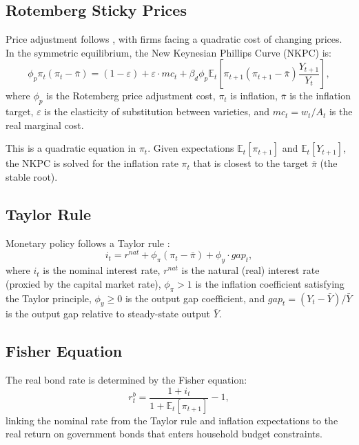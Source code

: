 \documentclass[12pt]{article}
\newcommand{\E}{\mathbb{E}}
\begin{document}
\subsection{Rotemberg Sticky Prices}\label{sec:rotemberg}

Price adjustment follows \citet{rotemberg1982}, with firms facing a quadratic cost of changing prices. In the symmetric equilibrium, the New Keynesian Phillips Curve (NKPC) is:
\begin{equation}\label{eq:nkpc}
  \phi_p \pi_t (\pi_t - \bar{\pi}) = (1 - \varepsilon) + \varepsilon \cdot mc_t + \beta_d \phi_p \E_t\!\left[\pi_{t+1}(\pi_{t+1} - \bar{\pi}) \frac{Y_{t+1}}{Y_t}\right],
\end{equation}
where $\phi_p$ is the Rotemberg price adjustment cost, $\pi_t$ is inflation, $\bar{\pi}$ is the inflation target, $\varepsilon$ is the elasticity of substitution between varieties, and $mc_t = w_t / A_t$ is the real marginal cost.

This is a quadratic equation in $\pi_t$. Given expectations $\E_t[\pi_{t+1}]$ and $\E_t[Y_{t+1}]$, the NKPC is solved for the inflation rate $\pi_t$ that is closest to the target $\bar{\pi}$ (the stable root).

\subsection{Taylor Rule}\label{sec:taylor}

Monetary policy follows a Taylor rule \citep{taylor1993}:
\begin{equation}\label{eq:taylor}
  i_t = r^{nat} + \phi_\pi (\pi_t - \bar{\pi}) + \phi_y \cdot gap_t,
\end{equation}
where $i_t$ is the nominal interest rate, $r^{nat}$ is the natural (real) interest rate (proxied by the capital market rate), $\phi_\pi > 1$ is the inflation coefficient satisfying the Taylor principle, $\phi_y \geq 0$ is the output gap coefficient, and $gap_t = (Y_t - \bar{Y})/\bar{Y}$ is the output gap relative to steady-state output $\bar{Y}$.

\subsection{Fisher Equation}

The real bond rate is determined by the Fisher equation:
\begin{equation}\label{eq:fisher}
  r^b_t = \frac{1 + i_t}{1 + \E_t[\pi_{t+1}]} - 1,
\end{equation}
linking the nominal rate from the Taylor rule and inflation expectations to the real return on government bonds that enters household budget constraints.
\end{document}
